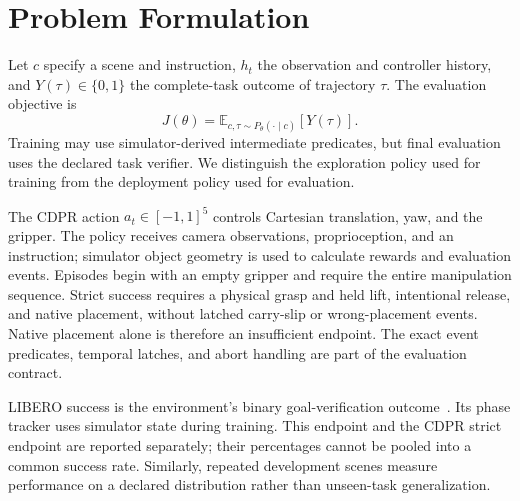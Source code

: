 \section{Problem Formulation}\label{sec:problem}
Let $c$ specify a scene and instruction, $h_t$ the observation and controller history, and $Y(\tau)\in\{0,1\}$ the complete-task outcome of trajectory $\tau$. The evaluation objective is
\begin{equation}
J(\theta)=\mathbb{E}_{c,\tau\sim P_\theta(\cdot\mid c)}[Y(\tau)].
\end{equation}
Training may use simulator-derived intermediate predicates, but final evaluation uses the declared task verifier. We distinguish the exploration policy used for training from the deployment policy used for evaluation.

The CDPR action $a_t\in[-1,1]^5$ controls Cartesian translation, yaw, and the gripper. The policy receives camera observations, proprioception, and an instruction; simulator object geometry is used to calculate rewards and evaluation events. Episodes begin with an empty gripper and require the entire manipulation sequence. Strict success requires a physical grasp and held lift, intentional release, and native placement, without latched carry-slip or wrong-placement events. Native placement alone is therefore an insufficient endpoint. The exact event predicates, temporal latches, and abort handling are part of the evaluation contract.

LIBERO success is the environment's binary goal-verification outcome~\cite{libero}. Its phase tracker uses simulator state during training. This endpoint and the CDPR strict endpoint are reported separately; their percentages cannot be pooled into a common success rate. Similarly, repeated development scenes measure performance on a declared distribution rather than unseen-task generalization.
